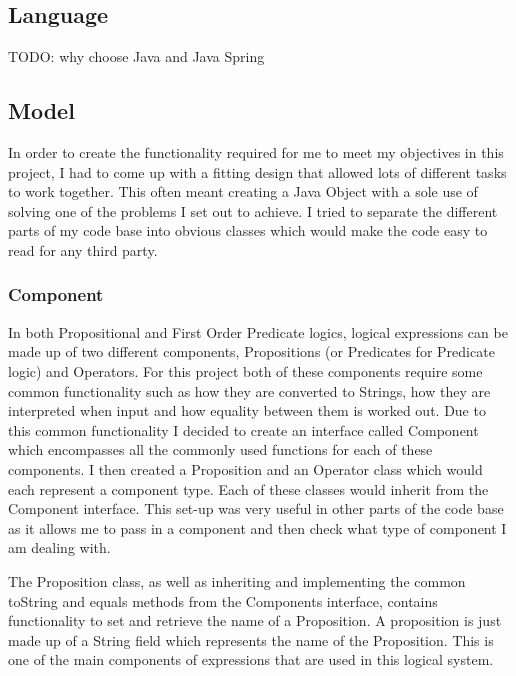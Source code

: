 \subsection{Language}

TODO: why choose Java and Java Spring

\subsection{Model}
In order to create the functionality required for me to meet my objectives in this project, I had to come up with a fitting design that allowed lots of different tasks to work together. This often meant creating a Java Object with a sole use of solving one of the problems I set out to achieve. I tried to separate the different parts of my code base into obvious classes which would make the code easy to read for any third party.

\subsubsection{Component}
In both Propositional and First Order Predicate logics, logical expressions can be made up of two different components, Propositions (or Predicates for Predicate logic) and Operators. For this project both of these components require some common functionality such as how they are converted to Strings, how they are interpreted when input and how equality between them is worked out. Due to this common functionality I decided to create an interface called Component which encompasses all the commonly used functions for each of these components. I then created a Proposition and an Operator class which would each represent a component type. Each of these classes would inherit from the Component interface. This set-up was very useful in other parts of the code base as it allows me to pass in a component and then check what type of component I am dealing with.  

The Proposition class, as well as inheriting and implementing the common toString and equals methods from the Components interface, contains functionality to set and retrieve the name of a Proposition. A proposition is just made up of a String field which represents the name of the Proposition. This is one of the main components of expressions that are used in this logical system.

